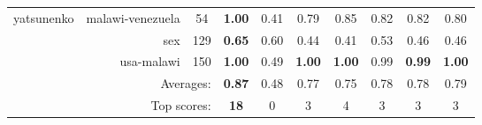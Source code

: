 \begin{tabular}{rrcccccccc}
\midrule
\multirow{3}{*}{yatsunenko}
& malawi-venezuela & 54 & \textbf{1.00} & 0.41 & 0.79 & 0.85 & 0.82 & 0.82 & 0.80 \\
& sex & 129 & \textbf{0.65} & 0.60 & 0.44 & 0.41 & 0.53 & 0.46 & 0.46 \\
& usa-malawi & 150 & \textbf{1.00} & 0.49 & \textbf{1.00} & \textbf{1.00} & 0.99 & \textbf{0.99} & \textbf{1.00} \\
\midrule
\multicolumn{3}{r}{Averages:} & \textbf{0.87}& 0.48& 0.77& 0.75& 0.78& 0.78& 0.79\\
\multicolumn{3}{r}{Top scores:} & \textbf{18}& 0& 3& 4& 3& 3& 3\\
\bottomrule
\end{tabular}